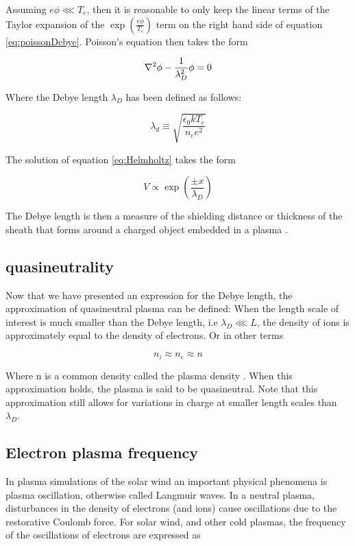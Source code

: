 Assuming $e \phi \lll T_e$, then it is reasonable to only keep the linear terms of the Taylor expansion of the $\exp (\frac{e \phi}{T_e})$ term on the right hand side of equation \ref{eq:poissonDebye}. Poisson's equation then takes the form

\begin{equation}
    \laplacian{\phi} - \frac{1}{\lambda_D^2} \phi = 0
\end{equation}


Where the Debye length $\lambda_D$ has been defined as follows:

\begin{equation}\label{eq:Helmholtz}
    \lambda_d \equiv \sqrt{\frac{\epsilon_0 k T_e}{n_e e^2}}
\end{equation}

The solution of equation \ref{eq:Helmholtz} takes the form

\begin{equation*}
    V \propto \exp (\frac{\pm x}{\lambda_D})
\end{equation*}

The Debye length is then a measure of the shielding distance or thickness of the sheath that forms around a charged object embedded in a plasma .


\subsection{quasineutrality}
Now that we have presented an expression for the Debye length, the approximation of quasineutral plasma can be defined: When the length scale of interest is much smaller than the Debye length, i.e $\lambda_D \lll L$, the density of ions is approximately equal to the density of electrons. Or in other terms

\begin{equation}
    n_i \approx n_e \approx n
\end{equation}

Where n is a common density called the plasma density . When this approximation holds, the plasma is said to be quasineutral. Note that this approximation still allows for variations in charge at smaller length scales than $\lambda_D$. 

\subsection{Electron plasma frequency}
In plasma simulations of the solar wind an important physical phenomena is plasma oscillation, otherwise called Langmuir waves. In a neutral plasma, disturbances in the density of electrons (and ions) cause oscillations due to the restorative Coulomb force. For solar wind, and other cold plasmas, the frequency of the oscillations of electrons are expressed as

